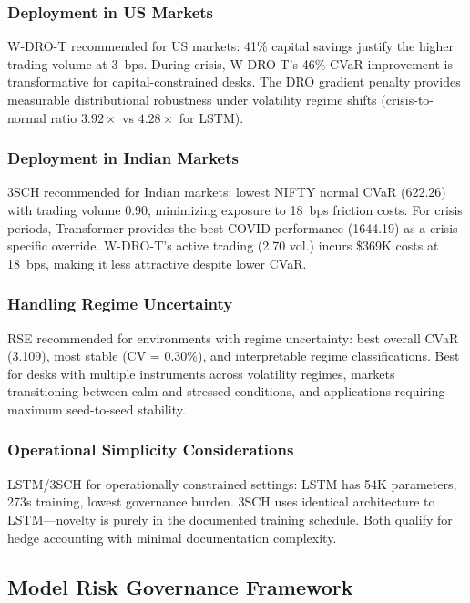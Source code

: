 \subsubsection{Deployment in US Markets}

W-DRO-T recommended for US markets: 41\% capital savings justify the higher trading volume at 3~bps. During crisis, W-DRO-T's 46\% CVaR improvement is transformative for capital-constrained desks. The DRO gradient penalty provides measurable distributional robustness under volatility regime shifts (crisis-to-normal ratio $3.92\times$ vs $4.28\times$ for LSTM).

\subsubsection{Deployment in Indian Markets}

3SCH recommended for Indian markets: lowest NIFTY normal CVaR (622.26) with trading volume 0.90, minimizing exposure to 18~bps friction costs. For crisis periods, Transformer provides the best COVID performance (1644.19) as a crisis-specific override. W-DRO-T's active trading (2.70 vol.) incurs \$369K costs at 18~bps, making it less attractive despite lower CVaR.

\subsubsection{Handling Regime Uncertainty}

RSE recommended for environments with regime uncertainty: best overall CVaR (3.109), most stable (CV = 0.30\%), and interpretable regime classifications. Best for desks with multiple instruments across volatility regimes, markets transitioning between calm and stressed conditions, and applications requiring maximum seed-to-seed stability.

\subsubsection{Operational Simplicity Considerations}

LSTM/3SCH for operationally constrained settings: LSTM has 54K parameters, 273s training, lowest governance burden. 3SCH uses identical architecture to LSTM---novelty is purely in the documented training schedule. Both qualify for hedge accounting with minimal documentation complexity.

\subsection{Model Risk Governance Framework}
\label{sec:governance}

